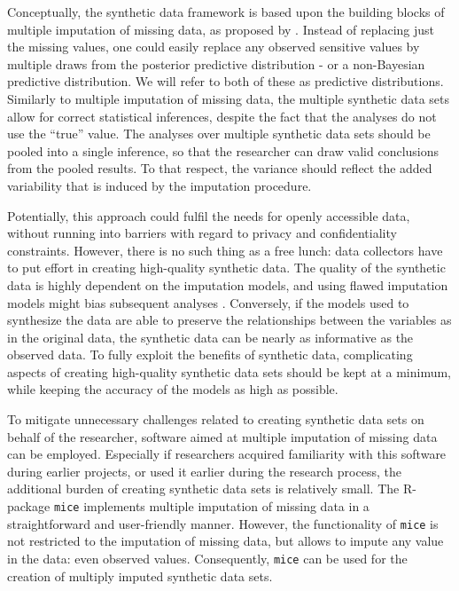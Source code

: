 \documentclass[psych,article,submit,moreauthors,pdftex]{mdpi}
\begin{document}
Conceptually, the synthetic data framework is based upon the building
blocks of multiple imputation of missing data, as proposed by
\citet{rubin_multiple_1987}. Instead of replacing just the missing
values, one could easily replace any observed sensitive values by
multiple draws from the posterior predictive distribution - or a
non-Bayesian predictive distribution. We will refer to both of these as
predictive distributions. Similarly to multiple imputation of missing
data, the multiple synthetic data sets allow for correct statistical
inferences, despite the fact that the analyses do not use the ``true''
value. The analyses over multiple synthetic data sets should be pooled
into a single inference, so that the researcher can draw valid
conclusions from the pooled results. To that respect, the variance
should reflect the added variability that is induced by the imputation
procedure.

Potentially, this approach could fulfil the needs for openly accessible
data, without running into barriers with regard to privacy and
confidentiality constraints. However, there is no such thing as a free
lunch: data collectors have to put effort in creating high-quality
synthetic data. The quality of the synthetic data is highly dependent on
the imputation models, and using flawed imputation models might bias
subsequent analyses
\citep{reiter2004simultaneous, grund2021using, jiang2021balancing}.
Conversely, if the models used to synthesize the data are able to
preserve the relationships between the variables as in the original
data, the synthetic data can be nearly as informative as the observed
data. To fully exploit the benefits of synthetic data, complicating
aspects of creating high-quality synthetic data sets should be kept at a
minimum, while keeping the accuracy of the models as high as possible.

To mitigate unnecessary challenges related to creating synthetic data
sets on behalf of the researcher, software aimed at multiple imputation
of missing data can be employed. Especially if researchers acquired
familiarity with this software during earlier projects, or used it
earlier during the research process, the additional burden of creating
synthetic data sets is relatively small. The R-package \texttt{mice}
\citep{mice} implements multiple imputation of missing data in a
straightforward and user-friendly manner. However, the functionality of
\texttt{mice} is not restricted to the imputation of missing data, but
allows to impute any value in the data: even observed values.
Consequently, \texttt{mice} can be used for the creation of multiply
imputed synthetic data sets.
\end{document}
